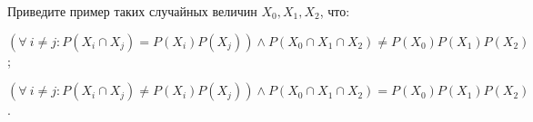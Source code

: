 Приведите пример таких случайных величин $X_0, X_1, X_2$, что:
\begin{enumcyr}
    \item $\left( \forall~ i \neq j: P(X_i \cap X_j) = P(X_i) P(X_j) \right) \land P(X_0 \cap X_1 \cap
        X_2) \neq P(X_0) P(X_1) P(X_2)$;
    \item $\left( \forall~ i \neq j: P(X_i \cap X_j) \neq P(X_i) P(X_j) \right) \land P(X_0 \cap X_1 \cap
        X_2) = P(X_0) P(X_1) P(X_2)$.
\end{enumcyr}